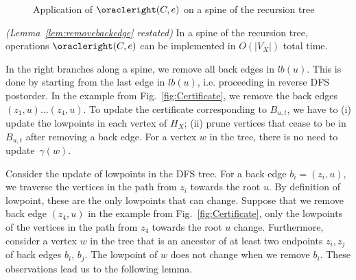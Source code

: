 \begin{figure*}[!t]
{
}

\caption{Application of $\oracleright(C,e)$ on a spine of the recursion tree}
\label{fig:oracleleftexample}
\end{figure*}
\begin{lemma}
	\emph{(Lemma~\ref{lem:removebackedge} restated)} In a spine of
	the recursion tree, operations $\oracleright(C,e)$ can be
	implemented in $O(|V_X|)$ total time.
\end{lemma}

	In the right branches along a spine, we remove all back edges
	in $lb(u)$. This is done by starting from the last edge in
	$lb(u)$, i.e. proceeding in reverse DFS postorder. In the
	example from Fig.~\ref{fig:Certificate}, we remove the back
	edges $(z_1,u) \ldots (z_4,u)$. To update the certificate
	corresponding to $B_{u,t}$, we have to (i) update the
	lowpoints in each vertex of $H_X$; (ii) prune vertices that
	cease to be in $B_{u,t}$ after removing a back edge. For a
	vertex $w$ in the tree, there is no need to update~$\gamma(w)$.

	Consider the update of lowpoints in the DFS tree.  For
	a back edge $b_i = (z_i,u)$, we traverse the vertices in the
	path from $z_i$ towards the root $u$. By definition of
	lowpoint, these are the only lowpoints that can change.
	Suppose that we remove back edge $(z_4,u)$ in the example from
	Fig.~\ref{fig:Certificate}, only the lowpoints of the vertices
	in the path from $z_4$ towards the root $u$ change.
	Furthermore, consider a vertex $w$ in the tree that is an
	ancestor of at least two endpoints $z_i, z_j$ of back edges
	$b_i$, $b_j$. The lowpoint of $w$ does not change when we
	remove $b_i$.  These observations lead us to the following
	lemma.

